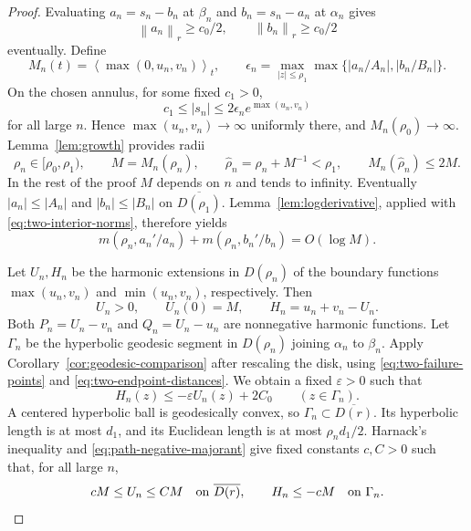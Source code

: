 \documentclass[12pt,letterpaper,reqno]{amsart}
\theoremstyle{definition}
\numberwithin{equation}{section}
\newcommand{\norm}[2]{\left\lVert #1\right\rVert_{#2}}
\newcommand{\mean}[2]{\left\langle #1\right\rangle_{#2}}
\begin{document}
\begin{proof}
		Evaluating $a_n=s_n-b_n$ at $\beta_n$ and
		$b_n=s_n-a_n$ at $\alpha_n$ gives
		\begin{equation}\label{eq:two-interior-norms}
			\norm{a_n}{r}\ge c_0/2,\qquad
			\norm{b_n}{r}\ge c_0/2
		\end{equation}
		eventually. Define
		\[
		M_n(t)=\mean{\max(0,u_n,v_n)}{t},\qquad
		\epsilon_n=\max_{|z|\le\rho_1}
		\max\{|a_n/A_n|,|b_n/B_n|\}.
		\]
		On the chosen annulus, for some fixed $c_1>0$,
		\[
		c_1\le |s_n|
		\le 2\epsilon_n e^{\max(u_n,v_n)}
		\]
		for all large $n$. Hence $\max(u_n,v_n)\to\infty$ uniformly there,
		and $M_n(\rho_0)\to\infty$. Lemma~\ref{lem:growth} provides radii
		\[
		\rho_n\in[\rho_0,\rho_1),\qquad
		M=M_n(\rho_n),\qquad
		\widehat\rho_n=\rho_n+M^{-1}<\rho_1,\qquad
		M_n(\widehat\rho_n)\le2M.
		\]
		In the rest of the proof $M$ depends on $n$ and tends to infinity.
		Eventually $|a_n|\le|A_n|$ and $|b_n|\le|B_n|$ on
		$\overline{D(\rho_1)}$. Lemma~\ref{lem:logderivative}, applied with
		\eqref{eq:two-interior-norms}, therefore yields
		\begin{equation}\label{eq:two-log-errors}
			m(\rho_n,a_n'/a_n)+m(\rho_n,b_n'/b_n)=O(\log M).
		\end{equation}
		
		Let $U_n,H_n$ be the harmonic extensions in $D(\rho_n)$ of the
		boundary functions $\max(u_n,v_n)$ and $\min(u_n,v_n)$, respectively.
		Then
		\[
		U_n>0,\qquad U_n(0)=M,\qquad H_n=u_n+v_n-U_n.
		\]
		Both $P_n=U_n-v_n$ and $Q_n=U_n-u_n$ are nonnegative harmonic
		functions. Let $\Gamma_n$ be the hyperbolic geodesic segment in
		$D(\rho_n)$ joining $\alpha_n$ to $\beta_n$.
		Apply Corollary~\ref{cor:geodesic-comparison} after rescaling the disk,
		using \eqref{eq:two-failure-points} and
		\eqref{eq:two-endpoint-distances}. We obtain a fixed $\varepsilon>0$
		such that
		\begin{equation}\label{eq:path-negative-majorant}
			H_n(z)\le-\varepsilon U_n(z)+2C_0
			\qquad(z\in\Gamma_n).
		\end{equation}
		A centered hyperbolic ball is geodesically convex, so
		$\Gamma_n\subset\overline{D(r)}$. Its hyperbolic length is at most
		$d_1$, and its Euclidean length is at most $\rho_n d_1/2$.
		Harnack's inequality and \eqref{eq:path-negative-majorant} give fixed
		constants $c,C>0$ such that, for all large $n$,
		\[
		cM\le U_n\le CM\quad\hbox{on }\overline{D(r)},
		\qquad H_n\le-cM\quad\hbox{on }\Gamma_n.
		\]
		

\end{proof}
\end{document}
